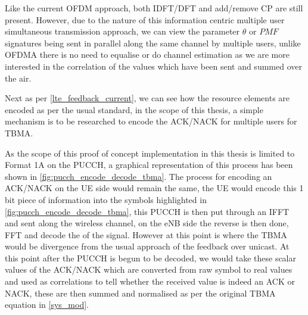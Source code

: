 \documentclass{article}
\begin{document}
Like the current OFDM approach, both IDFT/DFT and add/remove CP are still present. However, due to the nature of this information centric multiple user simultaneous transmission approach, we can view the parameter $\theta$ or $PMF$ signatures being sent in parallel along the same channel by multiple users, unlike OFDMA there is no need to equalise or do channel estimation as we are more interested in the correlation of the values which have been sent and summed over the air.

Next as per \cref{lte_feedback_current}, we can see how the resource elements are encoded as per the usual standard, in the scope of this thesis, a simple mechanism is to be researched to encode the ACK/NACK for multiple users for TBMA.

As the scope of this proof of concept implementation in this thesis is limited to Format 1A on the PUCCH, a graphical representation of this process has been shown in \cref{fig:pucch_encode_decode_tbma}. The process for encoding an ACK/NACK on the UE side would remain the same, the UE would encode this 1 bit piece of information into the symbols highlighted in \cref{fig:pucch_encode_decode_tbma}, this PUCCH is then put through an IFFT and sent along the wireless channel, on the eNB side the reverse is then done, FFT and decode the of the signal. However at this point is where the TBMA would be divergence from the usual approach of the feedback over unicast. At this point after the PUCCH is begun to be decoded, we would take these scalar values of the ACK/NACK which are converted from raw symbol to real values and used as correlations to tell whether the received value is indeed an ACK or NACK, these are then summed and normalised as per the original TBMA equation in \cref{sys_mod}.
\end{document}

